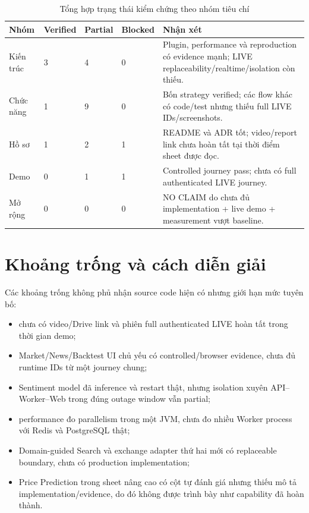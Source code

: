 \documentclass[12pt,a4paper,oneside]{report}
\begin{document}
\begin{table}[H]
  \centering
  \caption{Tổng hợp trạng thái kiểm chứng theo nhóm tiêu chí}
  \label{tab:evidence-summary}
  \begin{tabularx}{\textwidth}{L{3.4cm}C{2cm}C{2cm}C{2cm}Y}
    \toprule
    \textbf{Nhóm} & \textbf{Verified} & \textbf{Partial} & \textbf{Blocked} & \textbf{Nhận xét} \\
    \midrule
    Kiến trúc & 3 & 4 & 0 & Plugin, performance và reproduction có evidence mạnh; LIVE replaceability/realtime/isolation còn thiếu. \\
    Chức năng & 1 & 9 & 0 & Bốn strategy verified; các flow khác có code/test nhưng thiếu full LIVE IDs/screenshots. \\
    Hồ sơ & 1 & 2 & 1 & README và ADR tốt; video/report link chưa hoàn tất tại thời điểm sheet được đọc. \\
    Demo & 0 & 1 & 1 & Controlled journey pass; chưa có full authenticated LIVE journey. \\
    Mở rộng & 0 & 0 & 0 & NO CLAIM do chưa đủ implementation + live demo + measurement vượt baseline. \\
    \bottomrule
  \end{tabularx}
\end{table}

\section{Khoảng trống và cách diễn giải}

Các khoảng trống không phủ nhận source code hiện có nhưng giới hạn mức tuyên bố:
\begin{itemize}
  \item chưa có video/Drive link và phiên full authenticated LIVE hoàn tất trong thời gian demo;
  \item Market/News/Backtest UI chủ yếu có controlled/browser evidence, chưa đủ runtime IDs từ một journey chung;
  \item Sentiment model đã inference và restart thật, nhưng isolation xuyên API--Worker--Web trong đúng outage window vẫn partial;
  \item performance đo parallelism trong một JVM, chưa đo nhiều Worker process với Redis và PostgreSQL thật;
  \item Domain-guided Search và exchange adapter thứ hai mới có replaceable boundary, chưa có production implementation;
  \item Price Prediction trong sheet nâng cao có cột tự đánh giá nhưng thiếu mô tả implementation/evidence, do đó không được trình bày như capability đã hoàn thành.
\end{itemize}
\end{document}
